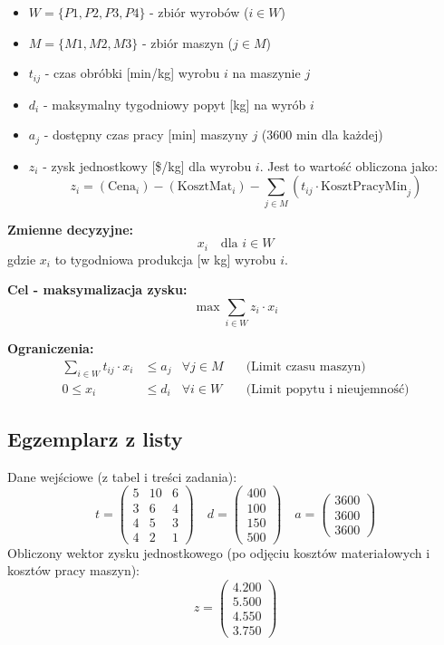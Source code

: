 \documentclass[11pt, a4paper]{article}
\begin{document}
\begin{itemize}
    \item $W = \{P1, P2, P3, P4\}$ - zbiór wyrobów ($i \in W$)
    \item $M = \{M1, M2, M3\}$ - zbiór maszyn ($j \in M$)
    \item $t_{ij}$ - czas obróbki [min/kg] wyrobu $i$ na maszynie $j$
    \item $d_i$ - maksymalny tygodniowy popyt [kg] na wyrób $i$
    \item $a_j$ - dostępny czas pracy [min] maszyny $j$ (3600 min dla każdej)
    \item $z_i$ - zysk jednostkowy [\$/kg] dla wyrobu $i$. Jest to wartość obliczona jako:
    \[ z_i = (\text{Cena}_i) - (\text{KosztMat}_i) - \sum_{j \in M} (t_{ij} \cdot \text{KosztPracyMin}_j) \]
\end{itemize}

\noindent \textbf{Zmienne decyzyjne:}
$$ x_i \quad \text{dla } i \in W $$
gdzie $x_i$ to tygodniowa produkcja [w kg] wyrobu $i$.

\noindent \textbf{Cel - maksymalizacja zysku:}
$$ \max \sum_{i \in W} z_i \cdot x_i $$

\noindent \textbf{Ograniczenia:}
\begin{align*}
    \sum_{i \in W} t_{ij} \cdot x_i &\le a_j & \forall j \in M \quad &\text{(Limit czasu maszyn)} \\
    0 \le x_i &\le d_i & \forall i \in W \quad &\text{(Limit popytu i nieujemność)}
\end{align*}

\subsection{Egzemplarz z listy}
Dane wejściowe (z tabel i treści zadania):
$$ t =
\begin{pmatrix}
5 & 10 & 6 \\
3 & 6 & 4 \\
4 & 5 & 3 \\
4 & 2 & 1
\end{pmatrix} 
\quad d =
\begin{pmatrix}
400 \\ 100 \\ 150 \\ 500
\end{pmatrix} 
\quad a =
\begin{pmatrix}
3600 \\ 3600 \\ 3600
\end{pmatrix} 
$$
Obliczony wektor zysku jednostkowego (po odjęciu kosztów materiałowych i kosztów pracy maszyn):
$$ z =
\begin{pmatrix}
4.200 \\ 5.500 \\ 4.550 \\ 3.750
\end{pmatrix}
$$
\end{document}
